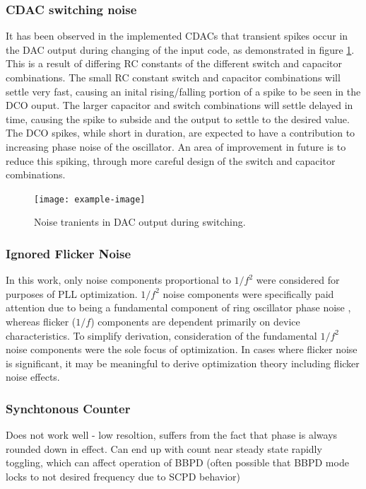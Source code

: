	\subsubsection{CDAC switching noise}	
		It has been observed in the implemented CDACs that transient spikes occur in the DAC output during changing of the input code, as demonstrated in figure \ref{fig:dac_sw_noise}. This is a result of differing RC constants of the different switch and capacitor combinations.  The small RC constant switch and capacitor combinations will settle very fast, causing an inital rising/falling portion of a spike to be seen in the DCO ouput. The larger capacitor and switch combinations will settle delayed in time, causing the spike to subside and the output to settle to the desired value. The DCO spikes, while short in duration, are expected to have a contribution to increasing phase noise of the oscillator. An area of improvement in future is to reduce this spiking, through more careful design of the switch and capacitor combinations. 
		\begin{figure}[htb!]
	        \centering
	        \texttt{[image: example-image]}
		    \caption{Noise tranients in DAC output during switching.}
		    \label{fig:dac_sw_noise}
		\end{figure}

	\subsubsection{Ignored Flicker Noise}
	In this work, only noise components proportional to $1/f^2$ were considered for purposes of PLL optimization. $1/f^2$ noise components were specifically paid attention due to being a fundamental component of ring oscillator phase noise \cite{Navid2005}, whereas flicker ($1/f$) components are dependent primarily on device characteristics. To simplify derivation, consideration of the fundamental $1/f^2$ noise components were the sole focus of optimization. In cases where flicker noise is significant, it may be meaningful to derive optimization theory including flicker noise effects.

	\subsubsection{Synchtonous Counter}
	Does not work well - low resoltion, suffers from the fact that phase is always rounded down in effect. Can end up with count near steady state rapidly toggling, which can affect operation of BBPD (often possible that BBPD mode locks to not desired frequency due to SCPD behavior)

\FloatBarrier
